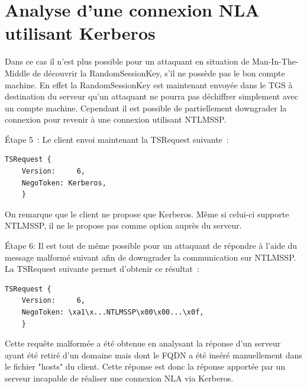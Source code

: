 \section{Analyse d'une connexion NLA utilisant Kerberos}
Dans ce cas il n’est plus possible pour un attaquant en situation de Man-In-The-Middle de d\'ecouvrir la RandomSessionKey, s’il ne possède pas le bon compte machine. En effet la RandomSessionKey est maintenant envoyée dans le TGS à destination du serveur qu’un attaquant ne pourra pas déchiffrer simplement avec un compte machine.
Cependant il est possible de partiellement downgrader la connexion pour revenir à une connexion utilisant NTLMSSP.

Étape 5 :
Le client envoi maintenant la TSRequest suivante :

\begin{lstlisting}[frame=single,basicstyle=\tiny]
TSRequest {
	Version:     6,
	NegoToken: Kerberos,
	}
\end{lstlisting}


On remarque que le client ne propose que Kerberos. Même si celui-ci supporte NTLMSSP, il ne le propose pas comme option auprès du serveur.

Étape 6: 
Il est tout de même possible pour un attaquant de r\'epondre à l'aide du message malformé suivant afin de downgrader la communication sur NTLMSSP. La TSRequest suivante permet d'obtenir ce résultat :

\begin{lstlisting}[frame=single,basicstyle=\tiny]
TSRequest {
	Version:     6,
	NegoToken: \xa1\x...NTLMSSP\x00\x00...\x0f,
	}
\end{lstlisting}


Cette requête malform\'ee a été obtenue en analysant la réponse d'un serveur ayant été retiré d'un domaine mais dont le FQDN a été inséré manuellement dans le fichier "hosts" du client. Cette réponse est donc la réponse apportée par un serveur incapable de réaliser une connexion NLA via Kerberos.

